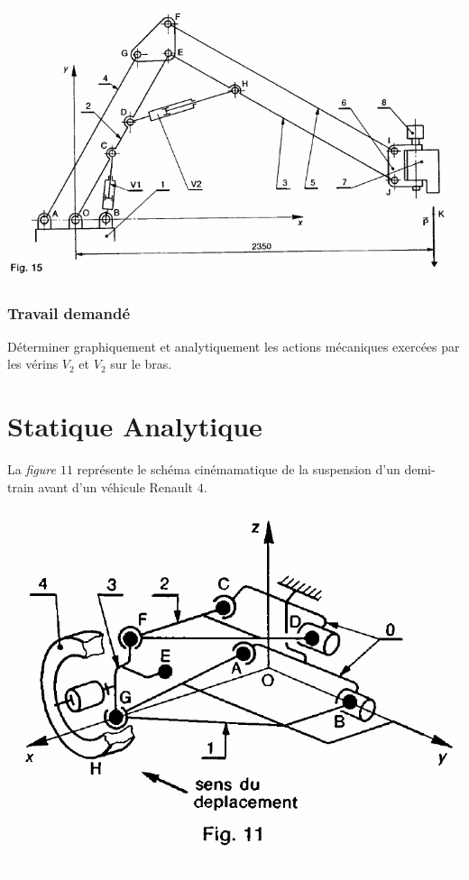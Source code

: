 \begin{center}
\includegraphics[scale=0.6]{png/manipulateur.png}
\end{center}

\subsubsection{Travail demandé}
Déterminer graphiquement et analytiquement les actions mécaniques exercées par les vérins $V_2$ et $V_2$ sur le bras.

\newpage



\section{Statique Analytique}


La \textit{figure $11$} représente le schéma cinémamatique de la suspension d'un demi-train avant d'un véhicule Renault $4$.

\begin{center}
\includegraphics[scale=0.4]{png/suspension.png}
\end{center}

